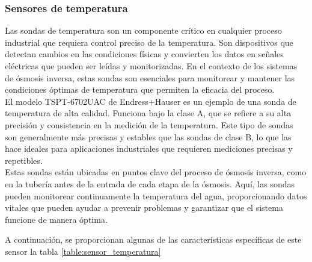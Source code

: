 \subsubsection{Sensores de temperatura} \label{sec:sensor_temp}

Las sondas de temperatura son un componente crítico en cualquier proceso industrial que requiera control preciso 
de la temperatura. Son dispositivos que detectan cambios en las condiciones físicas y convierten los datos en 
señales eléctricas que pueden ser leídas y monitorizadas. En el contexto de los sistemas de ósmosis inversa, 
estas sondas son esenciales para monitorear y mantener las condiciones óptimas de temperatura que permiten la 
eficacia del proceso.\\

El modelo TSPT-6702UAC de Endress+Hauser es un ejemplo de una sonda de temperatura de alta calidad. Funciona bajo 
la clase A, que se refiere a su alta precisión y consistencia en la medición de la temperatura. 
Este tipo de sondas son generalmente más precisas y estables que las sondas de clase B, lo que 
las hace ideales para aplicaciones industriales que requieren mediciones precisas y repetibles.\\

Estas sondas están ubicadas en puntos clave del proceso de ósmosis inversa, como en la tubería antes de la entrada de cada etapa de la ósmosis. Aquí, las sondas pueden monitorear continuamente la temperatura del agua, proporcionando datos vitales que pueden ayudar a prevenir problemas y garantizar que el sistema funcione de manera óptima.\\



A continuación, se proporcionan algunas de las características específicas de este sensor la tabla \ref{table:sensor_temperatura}\\


